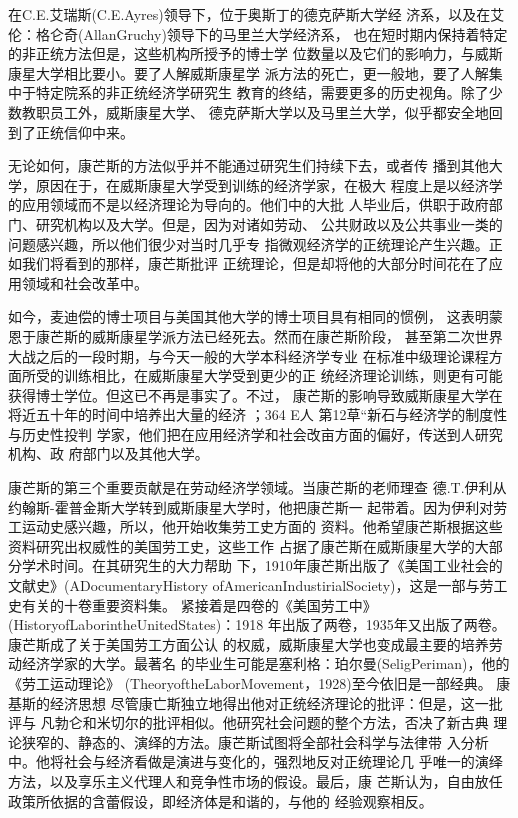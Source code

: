 在C.E.艾瑞斯(C.E.Ayres)领导下，位于奥斯丁的德克萨斯大学经
济系，以及在艾伦：格仑奇(AllanGruchy)领导下的马里兰大学经济系，
也在短时期内保持着特定的非正统方法但是，这些机构所授予的博士学
位数量以及它们的影响力，与威斯康星大学相比要小。要了人解威斯康星学
派方法的死亡，更一般地，要了人解集中于特定院系的非正统经济学研究生
教育的终结，需要更多的历史视角。除了少数教职员工外，威斯康星大学、
德克萨斯大学以及马里兰大学，似乎都安全地回到了正统信仰中来。

无论如何，康芒斯的方法似乎并不能通过研究生们持续下去，或者传
播到其他大学，原因在于，在威斯康星大学受到训练的经济学家，在极大
程度上是以经济学的应用领域而不是以经济理论为导向的。他们中的大批
人毕业后，供职于政府部门、研究机构以及大学。但是，因为对诸如劳动、
公共财政以及公共事业一类的问题感兴趣，所以他们很少对当时几乎专
指微观经济学的正统理论产生兴趣。正如我们将看到的那样，康芒斯批评
正统理论，但是却将他的大部分时间花在了应用领域和社会改革中。

如今，麦迪偿的博士项目与美国其他大学的博士项目具有相同的惯例，
这表明蒙恩于康芒斯的威斯康星学派方法已经死去。然而在康芒斯阶段，
甚至第二次世界大战之后的一段时期，与今天一般的大学本科经济学专业
在标准中级理论课程方面所受的训练相比，在威斯康星大学受到更少的正
统经济理论训练，则更有可能获得博士学位。但这已不再是事实了。不过，
康芒斯的影响导致威斯康星大学在将近五十年的时间中培养出大量的经济
；364
E人
第12草“新石与经济学的制度性与历史性投判
学家，他们把在应用经济学和社会改亩方面的偏好，传送到人研究机构、政
府部门以及其他大学。

康芒斯的第三个重要贡献是在劳动经济学领域。当康芒斯的老师理查
德.T.伊利从约翰斯-霍普金斯大学转到威斯康星大学时，他把康芒斯一
起带着。因为伊利对劳工运动史感兴趣，所以，他开始收集劳工史方面的
资料。他希望康芒斯根据这些资料研究出权威性的美国劳工史，这些工作
占据了康芒斯在威斯康星大学的大部分学术时间。在其研究生的大力帮助
下，1910年康芒斯出版了《美国工业社会的文献史》(ADocumentaryHistory
ofAmericanIndustirialSociety)，这是一部与劳工史有关的十卷重要资料集。
紧接着是四卷的《美国劳工中》(HistoryofLaborintheUnitedStates)：1918
年出版了两卷，1935年又出版了两卷。康芒斯成了关于美国劳工方面公认
的权威，威斯康星大学也变成最主要的培养劳动经济学家的大学。最著名
的毕业生可能是塞利格：珀尔曼(SeligPeriman)，他的《劳工运动理论》
(TheoryoftheLaborMovement，1928)至今依旧是一部经典。
康基斯的经济思想
尽管康亡斯独立地得出他对正统经济理论的批评：但是，这一批评与
凡勃仑和米切尔的批评相似。他研究社会问题的整个方法，否决了新古典
理论狭窄的、静态的、演绎的方法。康芒斯试图将全部社会科学与法律带
入分析中。他将社会与经济看做是演进与变化的，强烈地反对正统理论几
乎唯一的演绎方法，以及享乐主义代理人和竞争性市场的假设。最后，康
芒斯认为，自由放任政策所依据的含蕾假设，即经济体是和谐的，与他的
经验观察相反。

